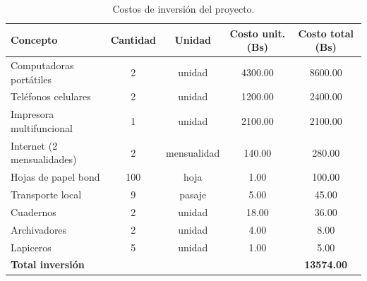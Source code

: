 \begin{table}[htbp]
    \centering
    \caption{Costos de inversión del proyecto.}
    \label{tab:costos_inversion}
    \renewcommand{\arraystretch}{1.35}
    \begin{tabularx}{\textwidth}{L C C C C}
        \toprule
        \textbf{Concepto} & \textbf{Cantidad} & \textbf{Unidad} & \textbf{Costo unit. (Bs)} & \textbf{Costo total (Bs)} \\
        \midrule
        Computadoras portátiles & 2 & unidad & 4300.00 & 8600.00 \\
        Teléfonos celulares & 2 & unidad & 1200.00 & 2400.00 \\
        Impresora multifuncional & 1 & unidad & 2100.00 & 2100.00 \\
        Internet (2 mensualidades) & 2 & mensualidad & 140.00 & 280.00 \\
        Hojas de papel bond & 100 & hoja & 1.00 & 100.00 \\
        Transporte local & 9 & pasaje & 5.00 & 45.00 \\
        Cuadernos & 2 & unidad & 18.00 & 36.00 \\
        Archivadores & 2 & unidad & 4.00 & 8.00 \\
        Lapiceros & 5 & unidad & 1.00 & 5.00 \\
        \midrule
        \textbf{Total inversión} & & & & \textbf{13574.00} \\
        \bottomrule
    \end{tabularx}
\end{table}
